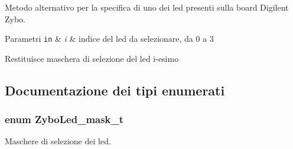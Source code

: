 Metodo alternativo per la specifica di uno dei led presenti sulla board Digilent Zybo. 


\begin{DoxyParams}[1]{Parametri}
\mbox{\tt in}  & {\em i} & indice del led da selezionare, da 0 a 3 \\
\hline
\end{DoxyParams}
\begin{DoxyReturn}{Restituisce}
maschera di selezione del led i-\/esimo 
\end{DoxyReturn}


\subsection{Documentazione dei tipi enumerati}
\hypertarget{group___led_gad11701cccac394f7e1f90de8f85695f3}{
\subsubsection[{Zybo\+Led\+\_\+mask\+\_\+t}]{\setlength{\rightskip}{0pt plus 5cm}enum {\bf Zybo\+Led\+\_\+mask\+\_\+t}}}\label{group___led_gad11701cccac394f7e1f90de8f85695f3}


Maschere di selezione dei led. 

